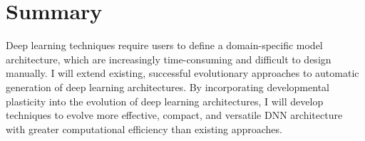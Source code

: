 \section{Summary}

Deep learning techniques require users to define a domain-specific model architecture, which are increasingly time-consuming and difficult to design manually.
I will extend existing, successful evolutionary approaches to automatic generation of deep learning architectures.
By incorporating developmental plasticity into the evolution of deep learning architectures, I will develop techniques to evolve more effective, compact, and versatile DNN architecture with greater computational efficiency than existing approaches.
